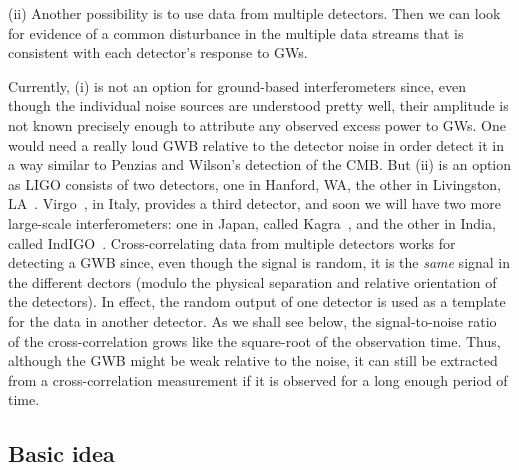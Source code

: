 (ii) Another possibility is to use data from 
multiple detectors.
Then we can look for evidence of a common 
disturbance in the multiple data streams that is
consistent with each detector's response to GWs.

Currently, (i) is not an option for ground-based 
interferometers since, even though the individual 
noise sources 
are understood pretty well, their amplitude is not 
known precisely enough to attribute any observed 
excess power to GWs.
One would need a really loud GWB relative to the
detector noise in order detect it in a way similar
to Penzias and Wilson's detection of the CMB.
But (ii) is an option as LIGO consists of two 
detectors, one in Hanford, WA, the other in Livingston, LA~\cite{LIGO:web}.
Virgo~\cite{Virgo:web}, in Italy, provides a third detector, 
and soon we will have two more large-scale 
interferometers: one in Japan, called Kagra~\cite{Kagra:web},
and the other in India, called IndIGO~\cite{Indigo:web}.
Cross-correlating data from multiple detectors works
for detecting a GWB since, even though the signal is 
random, it is the {\em same} signal in the different 
dectors (modulo the physical separation and relative
orientation of the detectors).
In effect, the random output of one detector is
used as a template for the data in another detector.
As we shall see below, the signal-to-noise ratio of 
the cross-correlation grows like the square-root of 
the observation time.
Thus, although the GWB might be weak 
relative to the noise, it can still be extracted from 
a cross-correlation measurement if it is observed
for a long enough period of time.

\subsection{Basic idea}
\label{s:basic_idea}

